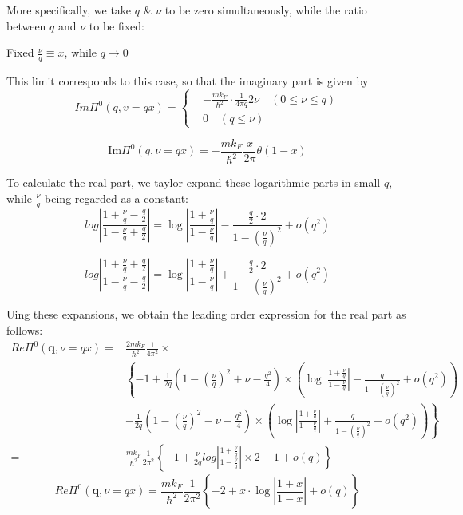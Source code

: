 \begin{itemize}
More specifically, we take $q$ \& $\nu$ to be zero simultaneously, while the ratio between $q$ and $\nu$ to be fixed:

\begin{center}Fixed $\frac{\nu}{q} \equiv x$, while $q\rightarrow 0$ \end{center}

This limit corresponds to this case, so that the imaginary part is given by
\[ Im\Pi^0(q,v=q x) = \left\{ \begin{split}&-\frac{m k_F}{\hbar^2} \cdot \frac{1}{4\pi q} 2\nu \quad (0\leq \nu \leq q)\\
&0 \quad (q \leq \nu) \end{split} \right. \]

\begin{equation*} \label{Eqs2.8.27.a} \tag{2.8.27.a}
\text{Im} \Pi^0(q,\nu=q x) = -\frac{m k_F}{\hbar^2}\frac{x}{2\pi} \theta(1-x)
\end{equation*}
\setcounter{equation}{27}

To calculate the real part, we taylor-expand these logarithmic parts in small $q$, while $\frac{\nu}{q}$ being regarded as a constant:
\[log\left| \frac{1+\frac{\nu}{q}-\frac{q}{2}}{1-\frac{\nu}{q}+\frac{q}{2}} \right| = \log \left| \frac{1+\frac{\nu}{q}}{1-\frac{\nu}{q}} \right| - \frac{\frac{q}{2}\cdot 2}{1-(\frac{\nu}{q})^2} + o(q^2)\]

\[log\left| \frac{1+\frac{\nu}{q}+\frac{q}{2}}{1-\frac{\nu}{q}-\frac{q}{2}} \right| = \log \left| \frac{1+\frac{\nu}{q}}{1-\frac{\nu}{q}} \right| + \frac{\frac{q}{2}\cdot 2}{1-(\frac{\nu}{q})^2} + o(q^2)\]

Uing these expansions, we obtain the leading order expression for the real part as follows:
\[ \begin{split}Re\Pi^0(\mathbf{q},\nu=q x) =& \frac{2m k_F}{\hbar^2} \frac{1}{4\pi^2} \times\\
&\left\{ -1 + \frac{1}{2q}\left( 1-(\frac{\nu}{q})^2+\nu-\frac{q^2}{4} \right) \times \left( \log \left| \frac{1+\frac{\nu}{q}}{1-\frac{\nu}{q}} \right| - \frac{q}{1-(\frac{\nu}{q})^2} + o(q^2) \right) \right.\\
&\left.-\frac{1}{2q}\left( 1-(\frac{\nu}{q})^2-\nu-\frac{q^2}{4} \right) \times \left( \log \left| \frac{1+\frac{\nu}{q}}{1-\frac{\nu}{q}} \right| + \frac{q}{1-(\frac{\nu}{q})^2} + o(q^2) \right)\right\}\\
=&\frac{m k_F}{\hbar^2} \frac{1}{2\pi^2}\left\{ -1 + \frac{\nu}{2q}log\left| \frac{1+\frac{\nu}{q}}{1-\frac{\nu}{q}} \right| \times 2 - 1 + o(q) \right\}
\end{split}\]
\begin{equation*} \label{Eqs2.8.27.b} \tag{2.8.27.b}
Re\Pi^0(\mathbf{q},\nu=q x)=\frac{m k_F}{\hbar^2} \frac{1}{2\pi^2} \left\{ -2 + x\cdot \log\left| \frac{1+x}{1-x} \right|+ o(q) \right\}
\end{equation*}
\end{itemize}

